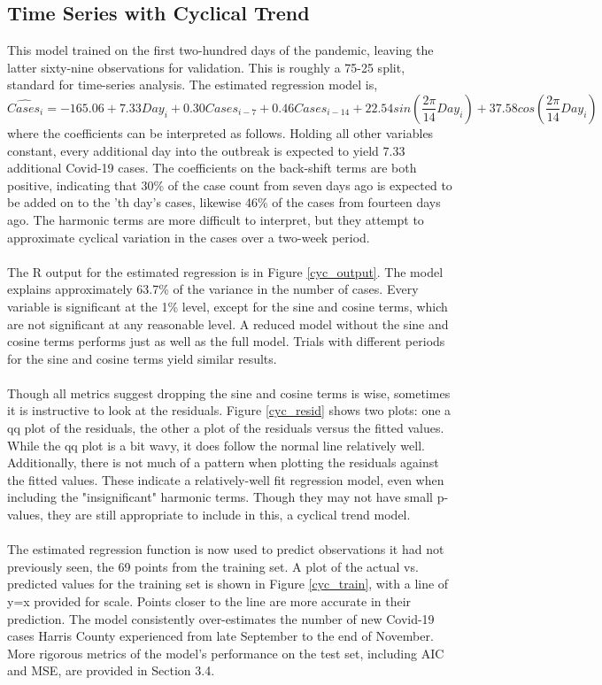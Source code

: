 \documentclass{article}
\begin{document}
\subsection{Time Series with Cyclical Trend}
This model trained on the first two-hundred days of the pandemic, leaving the latter sixty-nine observations for validation. This is roughly a 75-25 split, standard for time-series analysis. The estimated regression model is, \begin{equation}
    \hat{Cases_i} = -165.06 + 7.33Day_i + 0.30Cases_{i-7} + 0.46Cases_{i-14} + 22.54sin(\frac{2\pi}{14}Day_i) + 37.58cos(\frac{2\pi}{14}Day_i)
\end{equation}
where the coefficients can be interpreted as follows. Holding all other variables constant, every additional day into the outbreak is expected to yield 7.33 additional Covid-19 cases. The coefficients on the back-shift terms are both positive, indicating that 30\% of the case count from seven days ago is expected to be added on to the 'th day's cases, likewise 46\% of the cases from fourteen days ago. The harmonic terms are more difficult to interpret, but they attempt to approximate cyclical variation in the cases over a two-week period.\\\\
The R output for the estimated regression is in Figure \ref{cyc_output}. The model explains approximately 63.7\% of the variance in the number of cases. Every variable is significant at the 1\% level, except for the sine and cosine terms, which are not significant at any reasonable level. A reduced model without the sine and cosine terms performs just as well as the full model. Trials with different periods for the sine and cosine terms yield similar results.\\\\
Though all metrics suggest dropping the sine and cosine terms is wise, sometimes it is instructive to look at the residuals. Figure \ref{cyc_resid} shows two plots: one a qq plot of the residuals, the other a plot of the residuals versus the fitted values. While the qq plot is a bit wavy, it does follow the normal line relatively well. Additionally, there is not much of a pattern when plotting the residuals against the fitted values. These indicate a relatively-well fit regression model, even when including the "insignificant" harmonic terms. Though they may not have small p-values, they are still appropriate to include in this, a cyclical trend model.\\\\
The estimated regression function is now used to predict observations it had not previously seen, the 69 points from the training set. A plot of the actual vs. predicted values for the training set is shown in Figure \ref{cyc_train}, with a line of y=x provided for scale. Points closer to the line are more accurate in their prediction. The model consistently over-estimates the number of new Covid-19 cases Harris County experienced from late September to the end of November. More rigorous metrics of the model's performance on the test set, including AIC and MSE, are provided in Section 3.4.
\end{document}

